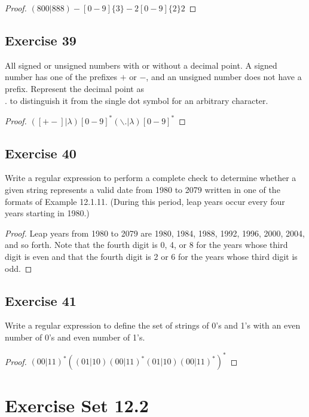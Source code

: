 \documentclass[14pt]{extarticle}
\begin{document}
\begin{proof}
    \((800|888)-[0-9]\{3\}-2[0-9]\{2\}2\)
\end{proof}

\subsection{Exercise 39}
All signed or unsigned numbers with or without a decimal point. A signed number has one of the prefixes \(+\) or \(-\),
and an unsigned number does not have a prefix. Represent the decimal point as \\. to distinguish it from the single dot
symbol for an arbitrary character.

\begin{proof}
    \(([+ -] | \lambda)[0 - 9]^* (\backslash. | \lambda)[0 - 9]^*\)
\end{proof}

\subsection{Exercise 40}
Write a regular expression to perform a complete check to determine whether a given string represents a valid date from
1980 to 2079 written in one of the formats of Example 12.1.11. (During this period, leap years occur every four years
starting in 1980.)

\begin{proof}
    Leap years from 1980 to 2079 are 1980, 1984, 1988, 1992, 1996, 2000, 2004, and so forth. Note that the fourth digit is 0, 4,
    or 8 for the years whose third digit is even and that the fourth digit is 2 or 6 for the years whose third digit is odd.
\end{proof}

\subsection{Exercise 41}
Write a regular expression to define the set of strings of 0’s and 1’s with an even number of 0’s and even number of 1’s.

\begin{proof}
    \((00|11)^*\left((01|10)(00|11)^*(01|10)(00|11)^*\right)^*\)
\end{proof}

\section{Exercise Set 12.2}
\end{document}
